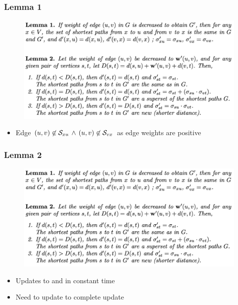 \begin{frame}
  \frametitle{Lemma 1}

  \begin{figure}[H]
    \centering
    \includegraphics[width=\textwidth, trim={0 8cm 0 0}, clip]{imgs/npr14-lemmas}
  \end{figure}

  \begin{itemize}
    \item Edge $(u,v) \not\in \mathcal{S}_{xu} \, \wedge \, (u,v)\not\in \mathcal{S}_{vx}$ as edge weights are positive
  \end{itemize}
\end{frame}


\begin{frame}
  \frametitle{Lemma 2}

  \begin{figure}[H]
    \centering
    \includegraphics[width=\textwidth, trim={0 0 0 3.5cm}, clip]{imgs/npr14-lemmas}
  \end{figure}

  \begin{itemize}
    \item Updates to \paths and \dist in constant time
    \item Need to update \pred to complete \spdag update
  \end{itemize}
\end{frame}


